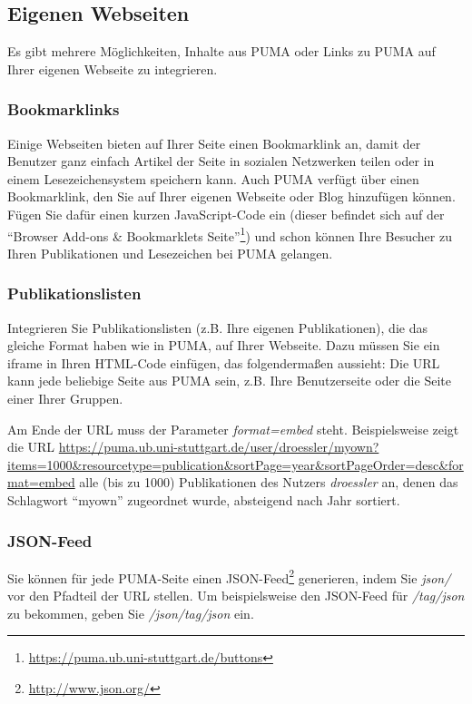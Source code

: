 \subsection{Eigenen Webseiten}
Es gibt mehrere Möglichkeiten, Inhalte aus PUMA oder Links zu PUMA auf Ihrer eigenen Webseite zu integrieren.

\subsubsection{Bookmarklinks}
Einige Webseiten bieten  auf Ihrer Seite einen Bookmarklink an, damit der Benutzer ganz einfach Artikel der Seite in sozialen Netzwerken teilen oder in einem Lesezeichensystem speichern kann. 
\newline Auch PUMA verfügt über einen Bookmarklink, den Sie auf Ihrer eigenen Webseite oder Blog hinzufügen können. Fügen Sie dafür einen kurzen JavaScript-Code ein (dieser befindet sich auf der \enquote{Browser Add-ons \& Bookmarklets Seite}\footnote{\url{https://puma.ub.uni-stuttgart.de/buttons}}) und schon können Ihre Besucher zu Ihren Publikationen und Lesezeichen bei PUMA gelangen.

\subsubsection{Publikationslisten}
Integrieren Sie Publikationslisten (z.B. Ihre eigenen Publikationen), die das gleiche Format haben wie in PUMA, auf Ihrer Webseite. Dazu müssen Sie ein iframe in Ihren HTML-Code einfügen, das folgendermaßen aussieht:\newline %
Die URL kann jede beliebige Seite aus PUMA sein, z.B. Ihre Benutzerseite oder die Seite einer Ihrer Gruppen. 
\begin{mdframed}[style=mdfexample1,frametitle={WICHTIG},backgroundcolor=gray!40]Am Ende der URL muss der Parameter \textit{format=embed} steht. Beispielsweise zeigt die URL \url{https://puma.ub.uni-stuttgart.de/user/droessler/myown?items=1000&resourcetype=publication&sortPage=year&sortPageOrder=desc&format=embed}
 alle (bis zu 1000) Publikationen des Nutzers \textit{droessler} an, denen das Schlagwort \enquote{myown} zugeordnet wurde, absteigend nach Jahr sortiert.
\end{mdframed}
\subsubsection{JSON-Feed}
Sie können für jede PUMA-Seite einen JSON-Feed\footnote{\url{http://www.json.org/}} generieren, indem Sie \textit{json/} vor den Pfadteil der URL stellen. Um beispielsweise den JSON-Feed für \textit{/tag/json} zu bekommen, geben Sie \textit{/json/tag/json} ein.

